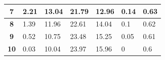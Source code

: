 \documentclass[UTF8]{ctexbeamer}
\numberwithin{equation}{section}  %
\begin{document}
\begin{frame}
\begin{table}[htbp]
\begin{tabular}{cllllll}
        \midrule
\textbf{7}    & 2.21                               & 13.04                              & 21.79                              & 12.96                              & 0.14                               & 0.63                               \\
        \midrule
\textbf{8}    & 1.39                               & 11.96                              & 22.61                              & 14.04                              & 0.1                                & 0.62                               \\
        \midrule
\textbf{9}    & 0.52                               & 10.75                              & 23.48                              & 15.25                              & 0.05                               & 0.61                               \\
        \midrule
\textbf{10}   & 0.03                               & 10.04                              & 23.97                              & 15.96                              & 0                                  & 0.6                               \\
        \bottomrule
\end{tabular}
\end{table}


\end{frame}
\end{document}
